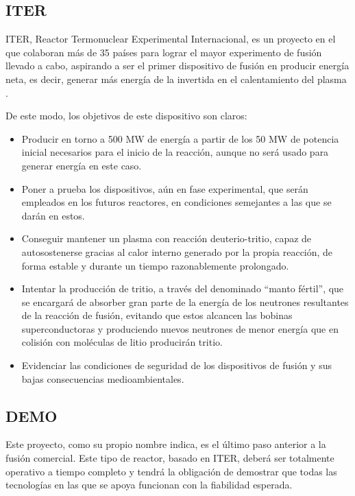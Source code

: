\subsection{ITER}

ITER,  Reactor Termonuclear Experimental Internacional, es un proyecto en el que colaboran más de 35 países para lograr el mayor experimento de fusión llevado a cabo, aspirando a ser el primer dispositivo de fusión en producir energía neta, es decir, generar más energía de la invertida en el calentamiento del plasma \cite{47}.

De este modo, los objetivos de este dispositivo son claros:

\begin{itemize}
    \item Producir en torno a 500 MW de energía a partir de los 50 MW de potencia inicial necesarios para el inicio de la reacción, aunque no será usado para generar energía en este caso.
    
    \item Poner a prueba los dispositivos, aún en fase experimental, que serán empleados en los futuros reactores, en condiciones semejantes a las que se darán en estos.
    
    \item Conseguir mantener un plasma con reacción deuterio-tritio, capaz de autosostenerse gracias al calor interno generado por la propia reacción, de forma estable y durante un tiempo razonablemente prolongado.
    
    \item Intentar la producción de tritio, a través del denominado “manto fértil”, que se encargará de absorber  gran parte de la energía de los neutrones resultantes de la reacción de fusión, evitando que estos alcancen las bobinas superconductoras y produciendo nuevos neutrones de menor energía que en colisión con moléculas de litio producirán tritio.
    
    \item Evidenciar las condiciones de seguridad de los dispositivos de fusión y sus bajas consecuencias medioambientales.
\end{itemize}

\subsection{DEMO} 

Este proyecto, como su propio nombre indica, es el último paso anterior a la fusión comercial. Este tipo de reactor, basado en ITER, deberá ser totalmente operativo a tiempo completo y  tendrá la obligación de demostrar que todas las tecnologías en las que se apoya funcionan con la fiabilidad esperada.

